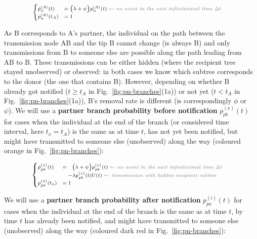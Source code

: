 \documentclass[10pt,letterpaper]{article}
\begin{document}
\begin{equation}
\scriptsize
\begin{cases}
\dot{p}_n^{(A)}(t) &=  \Big(\lambda + \psi\Big) p_n^{(A)}(t)\; \textit{\color{gray} $\leftarrow$ no event in the next infinitesimal time $\Delta t$ }\\
p_n^{(A)}(t_A) &= 1\label{eq:p-n}
\end{cases}
\end{equation}

As B corresponds to A's partner, the individual on the path between the transmission node AB and the tip B cannot change (is always B) and 
only transmissions from B to someone else are possible along the path leading from AB to B. These transmissions can be either hidden (where the recipient tree stayed unobserved) or observed: in both cases we know which subtree corresponds to the donor (the one that contains B). However, depending on whether B already got notified ($t \geq t_A$ in Fig.~\ref{fig:pn-branches}(1a)) or not yet ($t < t_A$ in Fig.~\ref{fig:pn-branches}(1a)), B's removal rate is different (is correspondingly $\phi$ or $\psi$). We will use a \textbf{partner branch probability before notification} $p_{pb}^{(x)}(t)$ for cases when the individual at the end of the branch (or considered time interval, here $t_x=t_A$) is the same as at time $t$, has not yet been notified, but might have transmitted to someone else (unobserved) along the way (coloured orange in Fig.~\ref{fig:pn-branches}):

\begin{equation}
\scriptsize
\begin{cases}
\dot{p}_{pb}^{(x)}(t) &=~~  \Big(\lambda + \psi\Big) p_{pb}^{(x)}(t)\; \textit{\color{gray} $\leftarrow$ no event in the next infinitesimal time $\Delta t$ }\\
    &~~~ - \lambda p_{pb}^{(x)}(t)U(t)\;  \textit{\color{gray} $\leftarrow$ transmission with hidden recipient subtree}\\
p_{pb}^{(x)}(t_x) &=  1\label{eq:p-pb}
\end{cases}
\end{equation}

We will use a \textbf{partner branch probability after notification} $p_{pa}^{(i)}(t)$ for cases when the individual at the end of the branch is the same as at time $t$, by time $t$ has already been notified, and might have transmitted to someone else (unobserved) along the way (coloured dark red in Fig.~\ref{fig:pn-branches}):
\end{document}
